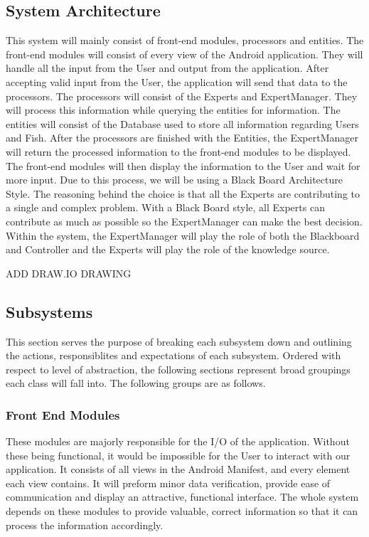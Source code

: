 \documentclass[]{article}
\begin{document}
\subsection{System Architecture}
\label{sub:system_architecture}
This system will mainly consist of front-end modules, processors and entities.
The front-end modules will consist of every view of the Android application. They will handle all the input from the User and output from the application. After accepting valid input from the User, the application will send that data to the processors. The processors will consist of the Experts and ExpertManager. They will process this information while querying the entities for information. The entities will consist of the Database used to store all information regarding Users and Fish. After the processors are finished with the Entities, the ExpertManager will return the processed information to the front-end modules to be displayed. The front-end modules will then display the information to the User and wait for more input. Due to this process, we will be using a Black Board Architecture Style. The reasoning behind the choice is that all the Experts are contributing to a single and complex problem. With a Black Board style, all Experts can contribute as much as possible so the ExpertManager can make the best decision. Within the system, the ExpertManager will play the role of both the Blackboard and Controller and the Experts will play the role of the knowledge source.

ADD DRAW.IO DRAWING

\subsection{Subsystems}
\label{sub:subsystems}
This section serves the purpose of breaking each subsystem down and outlining the actions, responsiblites and expectations of each subsystem. Ordered with respect to level of abstraction, the following sections represent broad groupings each class will fall into. The following groups are as follows.
\subsubsection{Front End Modules}
These modules are majorly responsible for the I/O of the application. Without these being functional, it would be impossible for the User to interact with our application. It consists of all views in the Android Manifest, and every element each view contains. It will preform minor data verification, provide ease of communication and display an attractive, functional interface. The whole system depends on these modules to provide valuable, correct information so that it can process the information accordingly.
\end{document}
